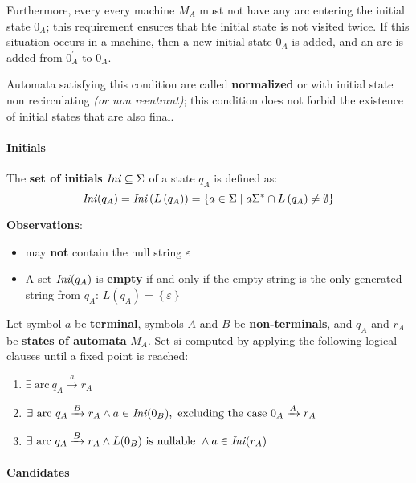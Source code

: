 \documentclass[english]{article}
\begin{document}
Furthermore, every every machine \(M_A\) must not have any arc entering the initial state \(0_A\); this requirement ensures that hte initial state is not visited twice.
If this situation occurs in a machine, then a new initial state \(0_A\) is added, and an arc is added from \(0^\prime_A\) to \(0_A\).

Automata satisfying this condition are called \textbf{normalized} or with initial state non recirculating \textit{(or non reentrant)};
this condition does not forbid the existence of initial states that are also final.

\paragraph{Initials}

The \textbf{set of initials} \(\textit{Ini}\hspace{0.1ex} \subseteq \Sigma\) of a state \(q_A\) is defined as:
\[ \textit{Ini}\hspace{0.1ex}(q_A) = \textit{Ini}\hspace{0.1ex}\left( L\left( q_A \right) \right) = \left\{ a \in \Sigma \mid a \Sigma^\ast \cap L\left( q_A \right) \neq \emptyset \right\} \]

\bigskip
\textbf{Observations}:

\begin{itemize}
  \item \Ini may \textbf{not} contain the null string \(\varepsilon\)
  \item A set \(\textit{Ini}\hspace{0.1ex}(q_A)\) is \textbf{empty} if and only if the empty string is the only generated string from \(q_A\): \(L\left( q_A \right) = \left\{ \varepsilon \right\}\)
\end{itemize}

\bigskip
Let symbol \(a\) be \textbf{terminal}, symbols \(A\) and \(B\) be \textbf{non-terminals}, and \(q_A\) and \(r_A\) be \textbf{states of automata} \(M_A\).
Set \Ini si computed by applying the following logical clauses until a fixed point is reached:

\begin{enumerate}
  \item \(\exists \ \text{arc} \ q_A \xrightarrow{a} r_A\)
  \item \(\exists \ \text{arc} \ q_A \xrightarrow{B} r_A \land a \in \Ini(0_B), \ \text{excluding the case} \ 0_A \xrightarrow{A} r_A\)
  \item \(\exists \ \text{arc} \ q_A \xrightarrow{B} r_A \land L(0_B) \ \text{is nullable} \ \land a \in \textit{Ini}\hspace{0.1ex}(r_A)\)
\end{enumerate}

\paragraph{Candidates}
\label{par:candidates}
\end{document}
